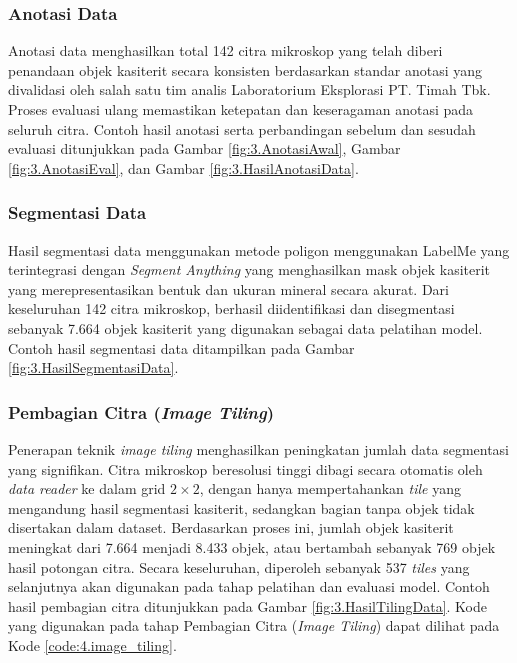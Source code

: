 \subsubsection{Anotasi Data}
Anotasi data menghasilkan total 142 citra mikroskop yang telah diberi penandaan objek kasiterit secara konsisten berdasarkan standar anotasi yang divalidasi oleh salah satu tim analis Laboratorium Eksplorasi PT. Timah Tbk. Proses evaluasi ulang memastikan ketepatan dan keseragaman anotasi pada seluruh citra. Contoh hasil anotasi serta perbandingan sebelum dan sesudah evaluasi ditunjukkan pada Gambar \ref{fig:3.AnotasiAwal}, Gambar \ref{fig:3.AnotasiEval}, dan Gambar \ref{fig:3.HasilAnotasiData}.

\subsubsection{Segmentasi Data}
Hasil segmentasi data menggunakan metode poligon menggunakan LabelMe yang terintegrasi dengan \textit{Segment Anything} yang menghasilkan mask objek kasiterit yang merepresentasikan bentuk dan ukuran mineral secara akurat. Dari keseluruhan 142 citra mikroskop, berhasil diidentifikasi dan disegmentasi sebanyak 7.664 objek kasiterit yang digunakan sebagai data pelatihan model. Contoh hasil segmentasi data ditampilkan pada Gambar \ref{fig:3.HasilSegmentasiData}.


\subsubsection{Pembagian Citra (\textit{Image Tiling})} 
Penerapan teknik \textit{image tiling} menghasilkan peningkatan jumlah data segmentasi yang signifikan. Citra mikroskop beresolusi tinggi dibagi secara otomatis oleh \textit{data reader} ke dalam grid $2 \times 2$, dengan hanya mempertahankan \textit{tile} yang mengandung hasil segmentasi kasiterit, sedangkan bagian tanpa objek tidak disertakan dalam dataset. Berdasarkan proses ini, jumlah objek kasiterit meningkat dari 7.664 menjadi 8.433 objek, atau bertambah sebanyak 769 objek hasil potongan citra. Secara keseluruhan, diperoleh sebanyak 537 \textit{tiles} yang selanjutnya akan digunakan pada tahap pelatihan dan evaluasi model. Contoh hasil pembagian citra ditunjukkan pada Gambar \ref{fig:3.HasilTilingData}. Kode yang digunakan pada tahap Pembagian Citra (\textit{Image Tiling}) dapat dilihat pada Kode \ref{code:4.image_tiling}. \par

